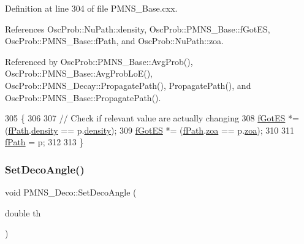 Definition at line 304 of file P\+M\+N\+S\+\_\+\+Base.\+cxx.



References Osc\+Prob\+::\+Nu\+Path\+::density, Osc\+Prob\+::\+P\+M\+N\+S\+\_\+\+Base\+::f\+Got\+ES, Osc\+Prob\+::\+P\+M\+N\+S\+\_\+\+Base\+::f\+Path, and Osc\+Prob\+::\+Nu\+Path\+::zoa.



Referenced by Osc\+Prob\+::\+P\+M\+N\+S\+\_\+\+Base\+::\+Avg\+Prob(), Osc\+Prob\+::\+P\+M\+N\+S\+\_\+\+Base\+::\+Avg\+Prob\+Lo\+E(), Osc\+Prob\+::\+P\+M\+N\+S\+\_\+\+Decay\+::\+Propagate\+Path(), Propagate\+Path(), and Osc\+Prob\+::\+P\+M\+N\+S\+\_\+\+Base\+::\+Propagate\+Path().


\begin{DoxyCode}
305 \{
306 
307   \textcolor{comment}{// Check if relevant value are actually changing}
308   \hyperlink{classOscProb_1_1PMNS__Base_a6dc5cd010d2d70b2324745b4e53e9839}{fGotES} *= (\hyperlink{classOscProb_1_1PMNS__Base_a849437aa8891fe042e86886ce8f81c6e}{fPath}.\hyperlink{structOscProb_1_1NuPath_a54ddd451db69bc54434de3cf18a117ca}{density} == p.\hyperlink{structOscProb_1_1NuPath_a54ddd451db69bc54434de3cf18a117ca}{density});
309   \hyperlink{classOscProb_1_1PMNS__Base_a6dc5cd010d2d70b2324745b4e53e9839}{fGotES} *= (\hyperlink{classOscProb_1_1PMNS__Base_a849437aa8891fe042e86886ce8f81c6e}{fPath}.\hyperlink{structOscProb_1_1NuPath_af3213f3691ba83c6bc05f4a3490f6b31}{zoa} == p.\hyperlink{structOscProb_1_1NuPath_af3213f3691ba83c6bc05f4a3490f6b31}{zoa});
310 
311   \hyperlink{classOscProb_1_1PMNS__Base_a849437aa8891fe042e86886ce8f81c6e}{fPath} = p;
312 
313 \}
\end{DoxyCode}
\mbox{\label{classOscProb_1_1PMNS__Deco_a35e79054682aa88c55f4350c29336014}} 
\subsubsection{\texorpdfstring{Set\+Deco\+Angle()}{SetDecoAngle()}}
{\footnotesize\ttfamily void P\+M\+N\+S\+\_\+\+Deco\+::\+Set\+Deco\+Angle (\begin{DoxyParamCaption}\item[{double}]{th }\end{DoxyParamCaption})\hspace{0.3cm}{\ttfamily [virtual]}}

